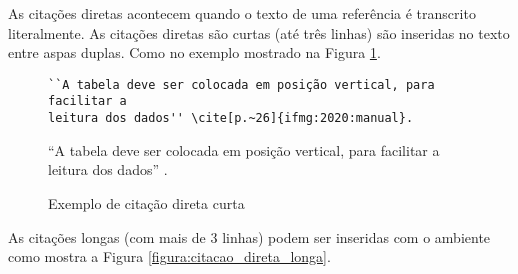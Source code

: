 
As citações diretas acontecem quando o texto de uma referência é transcrito literalmente. As citações diretas são curtas (até três linhas) são inseridas no texto entre aspas duplas. Como no exemplo mostrado na Figura \ref{figura:citacao_direta_curta}.


\begin{figure}[!htb]
\caption{Exemplo de citação direta curta} \label{figura:citacao_direta_curta}
\hrulefill\vspace*{-1em}

\begin{verbatim}
``A tabela deve ser colocada em posição vertical, para facilitar a
leitura dos dados'' \cite[p.~26]{ifmg:2020:manual}.
\end{verbatim}

\vspace*{-1.5em}\hrulefill

``A tabela deve ser colocada em posição vertical, para facilitar a leitura dos dados'' \cite[p.~25]{ifmg:2020:manual}.

\vspace*{-0.5em}\hrulefill
{}
\end{figure}


As citações longas (com mais de 3 linhas) podem ser inseridas com o ambiente  como mostra a Figura \ref{figura:citacao_direta_longa}.


